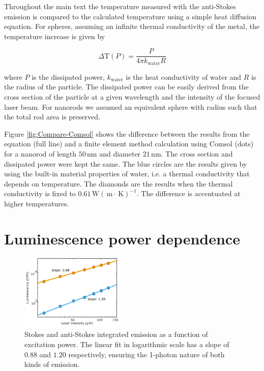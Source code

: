 \documentclass[journal=nalefd,manuscript=letter]{achemso}
\newcommand{\K}{\ensuremath{\,\textrm{K}}}
\newcommand{\nm}{\ensuremath{\,\textrm{nm}}}
\newcommand{\m}{\ensuremath{\,\textrm{m}}}
\newcommand{\W}{\ensuremath{\,\textrm{W}}}
\begin{document}
Throughout the main text the temperature measured with the anti-Stokes emission
is compared to the calculated temperature using a simple heat diffusion
equation. For spheres, assuming an infinite thermal conductivity of the metal,
the temperature increase is given by

\begin{equation}
	\Delta \textrm{T}(P) = \frac{P}{4\pi k_{\textrm{water}} R}
\end{equation}

\noindent where $P$ is the dissipated power, $k_{\textrm{water}}$ is the heat
conductivity of water and $R$ is the radius of the particle. The dissipated power can be
easily derived from the cross section of the particle at a given wavelength and
the intensity of the focused laser beam. For nanorods we assumed an
equivalent sphere with radius such that the total rod area is preserved.

Figure \ref{fig:Compare-Comsol} shows the difference between the results from
the equation (full line) and a finite element method calculation using Comsol
(dots) for a nanorod of length $50\nm$ and diameter $21\nm$. The cross section
and dissipated power were kept the same. The blue circles are the results given
by using the built-in material properties of water, i.e. a thermal conductivity
that depends on temperature. The diamonds are the results when the thermal
conductivity is fixed to $0.61 \W(\m\cdot\K)^{-1}$. The difference is
accentuated at higher temperatures.

\section{Luminescence power dependence}
\begin{figure}[htp] \centering
\includegraphics[width=0.45\textwidth]{Figures/Supplementary/03_AS_S_in_Log/01_AS_S_in_Log.png}
\caption{Stokes and anti-Stokes integrated emission as a function of excitation power. The
linear fit in logarithmic scale has a slope of $0.88$ and $1.20$ respectively,
ensuring the 1-photon nature of both kinds of emission.}
	\label{fig:Log_Plot}
\end{figure}
\end{document}
